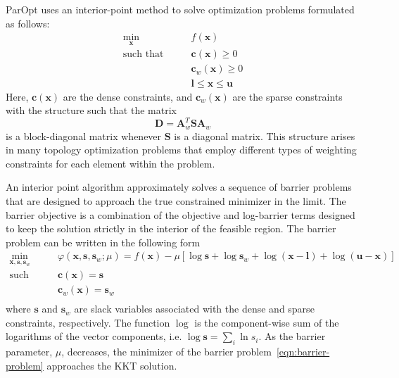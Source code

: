 \documentclass[12pt]{article}
\newcommand{\mb}{\mathbf}
\begin{document}
ParOpt uses an interior-point method to solve optimization problems formulated as follows:
\begin{equation}
  \label{eqn:opt-problem}
  \begin{aligned}
    \min_{\mb{x}} \qquad & f(\mb{x}) \\
    \text{such that} \qquad 
    & \mb{c}(\mb{x}) \ge 0 \\
    & \mb{c}_{w}(\mb{x}) \ge 0 \\
    & \mb{l} \le \mb{x} \le \mb{u}
  \end{aligned}
\end{equation}
Here, $\mb{c}(\mb{x})$ are the dense constraints, and $\mb{c}_{w}(\mb{x})$ are the sparse constraints with the structure such that the matrix
\begin{equation*}
  \mb{D} = \mb{A}_{w}^{T}\mb{S}\mb{A}_{w}
\end{equation*}
is a block-diagonal matrix whenever $\mb{S}$ is a diagonal matrix. 
This structure arises in many topology optimization problems that employ different types of weighting constraints for each element within the problem. 

An interior point algorithm approximately solves a sequence of barrier problems that are designed to approach the true constrained minimizer in the limit.
The barrier objective is a combination of the objective and log-barrier terms designed to keep the solution strictly in the interior of the feasible region. The barrier problem can be written in the following form
\begin{equation}
  \label{eqn:barrier-problem}
  \begin{aligned}
    \min_{\mb{x}, \mb{s}, \mb{s}_{w}} \qquad &  \varphi(\mb{x}, \mb{s}, \mb{s}_{w}; \mu) = f(\mb{x}) - \mu \left[ \log \mb{s} + \log \mb{s}_{w} + \log (\mb{x} - \mb{l}) + \log (\mb{u} - \mb{x})  \right] \\
    \text{such that} \qquad & \mb{c}(\mb{x}) = \mb{s} \\
    & \mb{c}_{w}(\mb{x}) = \mb{s}_{w} \\
  \end{aligned}
\end{equation}
where $\mb{s}$ and $\mb{s}_{w}$ are slack variables associated with the dense and sparse constraints, respectively. 
The function $\log$ is the component-wise sum of the logarithms of the vector components, i.e. $\log \mb{s} = \sum_{i} \ln s_{i}$.
As the barrier parameter, $\mu$, decreases, the minimizer of the barrier problem~\eqref{eqn:barrier-problem} approaches the KKT solution.
\end{document}
